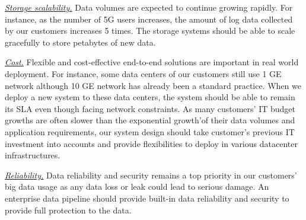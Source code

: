 

\noindent \underline{\textit{Storage scalability.}}  Data volumes are expected to continue growing rapidly. For instance, as the number of 5G users increases, the amount of log data collected by our customers increases 5 times. The storage systems should be able to scale gracefully to store petabytes of new data.



\noindent \underline{\textit{Cost.}} Flexible and cost-effective end-to-end solutions are important in real world deployment. For instance, some data centers of our customers still use 1 GE network although 10 GE network has already been a standard practice. When we deploy a new system to these data centers, the system should be able to remain its SLA even though facing network constraints. As many customers' IT budget growths are often slower than the exponential growth'of their data volumes and application requirements, our system design should take customer's previous IT investment into accounts and provide flexibilities to deploy in various datacenter infrastructures.





\noindent \underline{\textit{Reliability.}} Data reliability and security remains a top priority in our customers' big data usage as any data loss or leak  could lead to serious damage. An enterprise data pipeline should provide built-in data reliability and security to provide full protection to the data.








